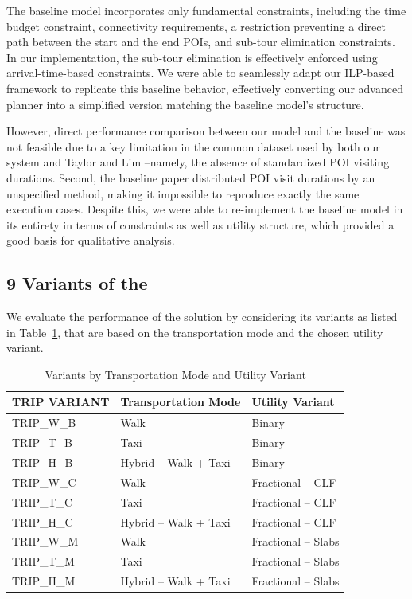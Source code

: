 The baseline model incorporates only fundamental constraints, including the time budget constraint, connectivity requirements, a restriction preventing a direct path between the start and the end POIs, and  sub-tour elimination constraints. In our implementation, the sub-tour elimination is effectively enforced using arrival-time-based constraints. We were able to seamlessly adapt our ILP-based framework to replicate this baseline behavior, effectively converting our advanced planner into a simplified version matching the baseline model's structure.

However, direct performance comparison between our model and the baseline was not feasible due to a key limitation in the common dataset used by both our system and Taylor and Lim \cite{taylor2018tour} --namely, the absence of standardized POI visiting durations. Second, the baseline paper distributed POI visit durations by an unspecified method, making it impossible to reproduce exactly the same execution cases. Despite this, we were able to re-implement the baseline model in its entirety in terms of constraints as well as utility structure, which provided a good basis for qualitative analysis. 

\subsection{9 Variants of the \trip}

We evaluate the performance of the \trip solution by considering its variants as listed in Table~\ref{tab:trip_variants}, that are based on the transportation mode and the chosen utility variant. 
\begin{table}[H]
\centering
\begin{tabular}{|l|l|l|}
\hline
\textbf{TRIP VARIANT} & \textbf{Transportation Mode} & \textbf{Utility Variant} \\
\hline
TRIP\_W\_B & Walk & Binary \\
TRIP\_T\_B & Taxi & Binary \\
TRIP\_H\_B & Hybrid -- Walk + Taxi & Binary \\
TRIP\_W\_C & Walk & Fractional -- CLF \\
TRIP\_T\_C & Taxi & Fractional -- CLF \\
TRIP\_H\_C & Hybrid -- Walk + Taxi & Fractional -- CLF \\
TRIP\_W\_M & Walk & Fractional -- Slabs \\
TRIP\_T\_M & Taxi & Fractional -- Slabs \\
TRIP\_H\_M & Hybrid -- Walk + Taxi & Fractional -- Slabs \\
\hline
\end{tabular}
\caption{\trip Variants by Transportation Mode and Utility Variant}
\label{tab:trip_variants}
\end{table}


